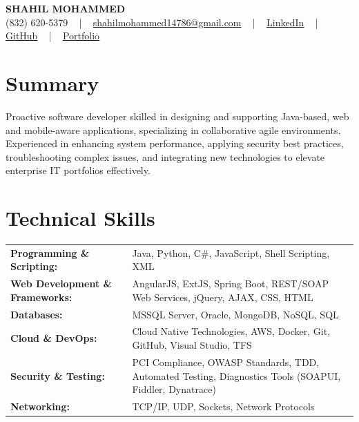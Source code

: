 \documentclass[letterpaper,11pt]{article}
\begin{document}
\begin{center}
    {\fontsize{14pt}{12pt}\selectfont \textbf{\MakeUppercase{Shahil Mohammed}}}\\ \vspace{2pt}
    \fontsize{10pt}{12pt}\selectfont (832) 620-5379 ~ | ~ \href{mailto:shahilmohammed14786@gmail.com}{shahilmohammed14786@gmail.com} ~ | ~  
    \href{https://www.linkedin.com/in/shahil-mohammed-9652931a1/}{\color{blue}\underline{LinkedIn}}  ~ | ~ 
    \href{https://github.com/freakbeast14}{\color{blue}\underline{GitHub}} ~ | ~ 
    \href{https://shahil-mohammed.netlify.app/}{\color{blue}\underline{Portfolio}}
    \vspace{-8pt}
\end{center}

\section{Summary}
\fontsize{9pt}{10pt}\selectfont
Proactive software developer skilled in designing and supporting Java-based, web and mobile-aware applications, specializing in collaborative agile environments. Experienced in enhancing system performance, applying security best practices, troubleshooting complex issues, and integrating new technologies to elevate enterprise IT portfolios effectively.  
 \vspace{-5pt}
 
\section{Technical Skills}
        \vspace{-14pt}
        \begin{table}[h]
            \fontsize{9pt}{10pt}\selectfont
            \begin{tabular}{p{0.35\linewidth} p{0.65\linewidth}}
                \textbf{Programming \& Scripting:} & Java, Python, C\#, JavaScript, Shell Scripting, XML \\
                \textbf{Web Development \& Frameworks:} & AngularJS, ExtJS, Spring Boot, REST/SOAP Web Services, jQuery, AJAX, CSS, HTML \\
                \textbf{Databases:} & MSSQL Server, Oracle, MongoDB, NoSQL, SQL \\
                \textbf{Cloud \& DevOps:} & Cloud Native Technologies, AWS, Docker, Git, GitHub, Visual Studio, TFS \\
                \textbf{Security \& Testing:} & PCI Compliance, OWASP Standards, TDD, Automated Testing, Diagnostics Tools (SOAPUI, Fiddler, Dynatrace) \\
                \textbf{Networking:} & TCP/IP, UDP, Sockets, Network Protocols \\
            \end{tabular}
        \end{table}
 \vspace{-15pt}
 
\end{document}
